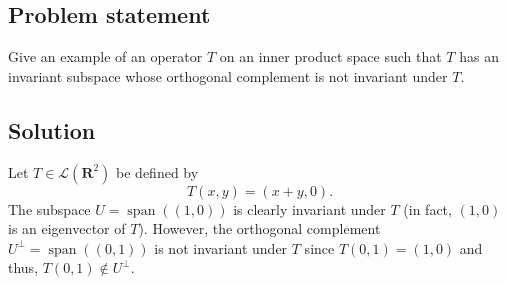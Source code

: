 \documentclass{article}
\begin{document}
\subsection*{Problem statement}
Give an example of an operator $T$ on an inner product space such that $T$ has an invariant subspace whose orthogonal complement is not invariant under $T$.

\subsection*{Solution}
Let $T\in\mathcal{L}(\textbf{R}^2)$ be defined by 
\[T(x,y)=(x+y,0).\]
The subspace $U=\operatorname{span}((1,0))$ is clearly invariant under $T$ (in fact, $(1,0)$ is an eigenvector of $T$). However, the orthogonal complement $U^\bot=\operatorname{span}((0,1))$ is not invariant under $T$ since $T(0,1)=(1,0)$ and thus, $T(0,1)\notin U^\bot$.
\end{document}
